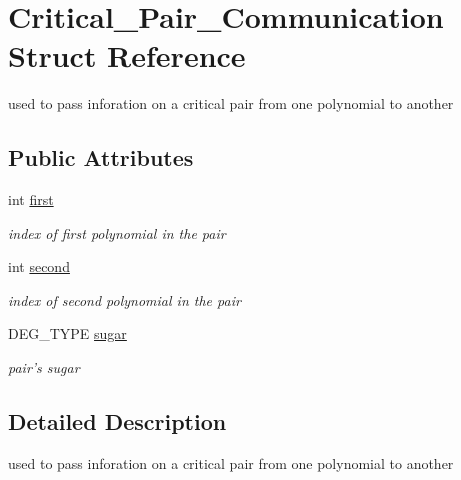 \hypertarget{struct_critical___pair___communication}{}\section{Critical\+\_\+\+Pair\+\_\+\+Communication Struct Reference}
\label{struct_critical___pair___communication}


used to pass inforation on a critical pair from one polynomial to another  


\subsection*{Public Attributes}
\begin{DoxyCompactItemize}
\item 
\mbox{\label{struct_critical___pair___communication_a6da52ba87f0519471f3e210edcae7aaf}} 
int \hyperlink{struct_critical___pair___communication_a6da52ba87f0519471f3e210edcae7aaf}{first}
\begin{DoxyCompactList}\small\item\em index of first polynomial in the pair \end{DoxyCompactList}\item 
\mbox{\label{struct_critical___pair___communication_a31d142d0bbe9779363941ab7ca17aeb1}} 
int \hyperlink{struct_critical___pair___communication_a31d142d0bbe9779363941ab7ca17aeb1}{second}
\begin{DoxyCompactList}\small\item\em index of second polynomial in the pair \end{DoxyCompactList}\item 
\mbox{\label{struct_critical___pair___communication_aad7f4fe920d80e19e16c195e49f07ae1}} 
D\+E\+G\+\_\+\+T\+Y\+PE \hyperlink{struct_critical___pair___communication_aad7f4fe920d80e19e16c195e49f07ae1}{sugar}
\begin{DoxyCompactList}\small\item\em pair's sugar \end{DoxyCompactList}\end{DoxyCompactItemize}


\subsection{Detailed Description}
used to pass inforation on a critical pair from one polynomial to another 

